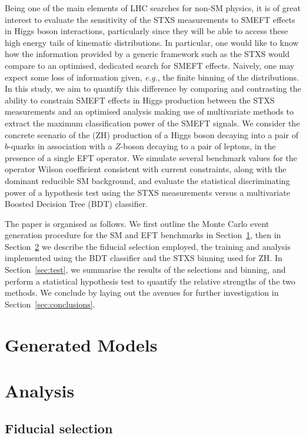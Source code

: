 \documentclass[11pt]{cernrep}
\begin{document}
Being one of the main elements of LHC searches for non-SM physics, it is of great interest to evaluate the sensitivity of the STXS measurements to SMEFT effects in Higgs boson interactions, particularly since they will be able to access these high energy tails of kinematic distributions. In particular, one would like to know how the information provided by a generic framework such as the STXS would compare to an optimised, dedicated search for SMEFT effects. Naively, one may expect some loss of information given, \emph{e.g.}, the finite binning of the distributions. In this study, we aim to quantify this difference by comparing and contrasting the ability to constrain SMEFT effects in Higgs production between the STXS measurements and an optimised analysis making use of multivariate methods to extract the maximum classification power of the SMEFT signals. We consider the concrete scenario of the (ZH) production of a Higgs boson decaying into a pair of $b$-quarks in association with a $Z$-boson  decaying to a pair of leptons, in the presence of a single EFT operator. We simulate several benchmark values for the operator Wilson coefficient consistent with current constraints, along with the dominant reducible SM background, and evaluate the statistical discriminating power of a hypothesis test using the STXS measurements versus a multivariate Boosted Decision Tree (BDT) classifier.

The paper is organised as follows. We first outline the Monte Carlo event generation procedure for the SM and EFT benchmarks in Section~\ref{sec:gen}, then in Section~\ref{sec:tools} we describe the fiducial selection employed, the training and analysis implemented using the BDT classifier and the STXS binning used for ZH. In Section~\ref{sec:test}, we summarise the results of the selections and binning, and perform a statistical hypothesis test to quantify the relative strengths of the two methods. We conclude by laying out the avenues for further investigation in Section~\ref{sec:conclusions}.

\section{Generated Models} 
\label{sec:gen}
%


\section{Analysis}
\label{sec:tools}
\subsection{Fiducial selection}
\label{sec:fiducial}

\end{document}
